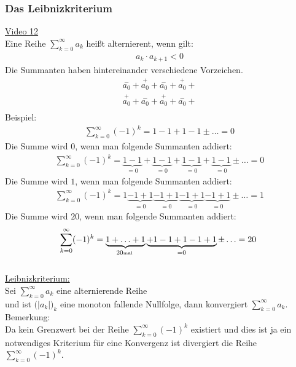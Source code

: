 \subsubsection{Das Leibnizkriterium}
\href{https://youtu.be/BM329RZgnwg}{Video 12}\\
Eine Reihe $ \sum\limits_{k=0}^{\infty} a_k$ heißt alternierent, wenn gilt: 
\begin{align*}
a_k\cdot a_{k+1}<0
\end{align*}
Die Summanten haben hintereinander verschiedene Vorzeichen.\\
\begin{align*}
\overset{-}{a_0}+\overset{+}{a_0}+\overset{-}{a_0}+\overset{+}{a_0}+\\
\overset{+}{a_0}+\overset{-}{a_0}+\overset{+}{a_0}+\overset{-}{a_0}+\\
\end{align*}
Beispiel:\\
\begin{align*}
\sum\limits_{k=0}^{\infty}(-1)^k=1-1+1-1\pm\ldots=0
\end{align*}
Die Summe wird $ 0 $, wenn man folgende Summanten addiert:\\
\begin{align*}
\sum\limits_{k=0}^{\infty}(-1)^k=\underbrace {1-1}_{=0}+\underbrace {1-1}_{=0}+\underbrace {1-1}_{=0}+\underbrace {1-1}_{=0}\pm\ldots=0
\end{align*}
Die Summe wird $ 1 $, wenn man folgende Summanten addiert:\\
\begin{align*}
\sum\limits_{k=0}^{\infty}(-1)^k=1\underbrace {-1+1}_{=0}\underbrace {-1+1}_{=0}\underbrace {-1+1}_{=0}\underbrace {-1+1}_{=0}\pm\ldots=1
\end{align*}
Die Summe wird $ 20 $, wenn man folgende Summanten addiert:\\
\begin{align*}
\sum\limits_{k=0}^{\infty}(-1)^k=\underbrace {1+\ldots +1}_{20\text{\tiny mal }}\underbrace {+1-1+1-1+1}_{=0}\pm\ldots=20\
\end{align*}
\\
\underline{Leibnizkriterium:}\\
Sei $ \sum\limits_{k=0}^{\infty}a_k $ eine alternierende Reihe\\ und ist $ \big(|a_k|\big)_k $ eine monoton fallende Nullfolge, dann konvergiert $ \sum\limits_{k=0}^{\infty}a_k $.
\\
Bemerkung:\\
Da kein Grenzwert bei der Reihe $\sum\limits_{k=0}^{\infty} (-1)^k  $ existiert und dies ist ja ein notwendiges Kriterium für eine Konvergenz ist divergiert die Reihe $ \sum\limits_{k=0}^{\infty} (-1)^k$.\\
